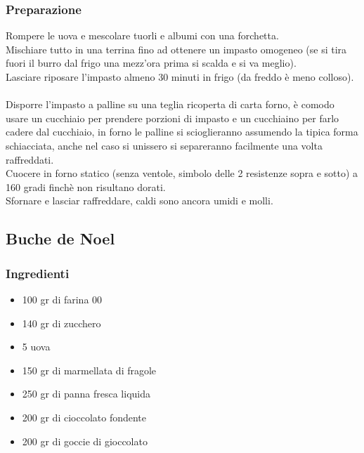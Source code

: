 \documentclass[12pt, a4paper]{article}
\begin{document}
\subsubsection{Preparazione}
	Rompere le uova e mescolare tuorli e albumi con una forchetta.\\
	Mischiare tutto in una terrina fino ad ottenere un impasto omogeneo
	(se si tira fuori il burro dal frigo una mezz'ora prima si scalda e 
	si va meglio).\\
	Lasciare riposare l'impasto almeno 30 minuti in frigo (da freddo è
	meno colloso).\\\\
	Disporre l'impasto a palline su una teglia ricoperta di carta forno,
	è comodo usare un cucchiaio per prendere porzioni di impasto e un
	cucchiaino per farlo cadere dal cucchiaio, in forno le palline si
	scioglieranno assumendo la tipica forma schiacciata, anche nel caso
	si unissero si separeranno facilmente una volta raffreddati.\\
	Cuocere in forno statico (senza ventole, simbolo delle 2 resistenze
	sopra e sotto) a 160 gradi finchè non risultano dorati.\\
	Sfornare e lasciar raffreddare, caldi sono ancora umidi e molli.
\clearpage

\subsection{Buche de Noel}

\subsubsection{Ingredienti}
\begin{itemize}
\item   100 gr di farina 00
\item	140 gr di zucchero
\item	5 uova
\item	150 gr di marmellata di fragole
\item	250 gr di panna fresca liquida
\item	200 gr di cioccolato fondente
\item	200 gr di goccie di gioccolato
\end{itemize}

\clearpage
\end{document}
